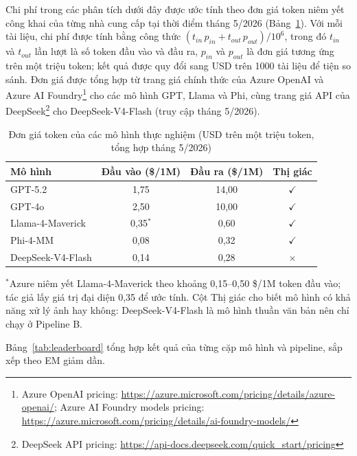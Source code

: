 ﻿\documentclass[12pt]{report}
\begin{document}
Chi phí trong các phân tích dưới đây được ước tính theo đơn giá token niêm yết công khai của từng nhà cung cấp tại thời điểm tháng 5/2026 (Bảng~\ref{tab:pricing}). Với mỗi tài liệu, chi phí được tính bằng công thức $(t_{in}\,p_{in} + t_{out}\,p_{out})/10^{6}$, trong đó $t_{in}$ và $t_{out}$ lần lượt là số token đầu vào và đầu ra, $p_{in}$ và $p_{out}$ là đơn giá tương ứng trên một triệu token; kết quả được quy đổi sang USD trên 1000 tài liệu để tiện so sánh. Đơn giá được tổng hợp từ trang giá chính thức của Azure OpenAI và Azure AI Foundry\footnote{Azure OpenAI pricing: \url{https://azure.microsoft.com/pricing/details/azure-openai/}; Azure AI Foundry models pricing: \url{https://azure.microsoft.com/pricing/details/ai-foundry-models/}} cho các mô hình GPT, Llama và Phi, cùng trang giá API của DeepSeek\footnote{DeepSeek API pricing: \url{https://api-docs.deepseek.com/quick_start/pricing}} cho DeepSeek-V4-Flash (truy cập tháng 5/2026).

\begin{table}[h]
\centering
\caption{Đơn giá token của các mô hình thực nghiệm (USD trên một triệu token, tổng hợp tháng 5/2026)}
\label{tab:pricing}
\begin{tabular}{|l|c|c|c|}
\hline
\textbf{Mô hình} & \textbf{Đầu vào (\$/1M)} & \textbf{Đầu ra (\$/1M)} & \textbf{Thị giác} \\ \hline
GPT-5.2           & 1,75       & 14,00 & $\checkmark$ \\ \hline
GPT-4o            & 2,50       & 10,00 & $\checkmark$ \\ \hline
Llama-4-Maverick  & 0,35$^{*}$ & 0,60  & $\checkmark$ \\ \hline
Phi-4-MM          & 0,08       & 0,32  & $\checkmark$ \\ \hline
DeepSeek-V4-Flash & 0,14       & 0,28  & $\times$ \\ \hline
\end{tabular}

\vspace{2pt}
{\footnotesize $^{*}$Azure niêm yết Llama-4-Maverick theo khoảng 0,15--0,50 \$/1M token đầu vào; tác giả lấy giá trị đại diện 0,35 để ước tính. Cột Thị giác cho biết mô hình có khả năng xử lý ảnh hay không: DeepSeek-V4-Flash là mô hình thuần văn bản nên chỉ chạy ở Pipeline B.}
\end{table}

Bảng~\ref{tab:leaderboard} tổng hợp kết quả của từng cặp mô hình và pipeline, sắp xếp theo EM giảm dần.
\end{document}
